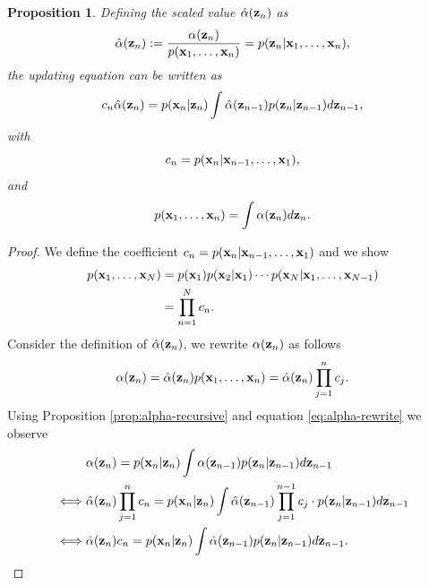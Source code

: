 \documentclass[12pt, oneside]{book}
\numberwithin{equation}{section}
\newcommand{\x}{{\bf x}}
\newcommand{\z}{{\bf z}}
\newtheorem{proposition}{Proposition}[section]
\begin{document}
{%

\begin{proposition} \label{prop:alpha-hat}
	Defining the scaled value $\hat\alpha(\z_n)$ as
	\begin{equation}
		\hat\alpha(\z_n) := \frac{\alpha(\z_n)}{p(\x_1, \ldots, \x_n)} = p(\z_n \vert \x_1, \ldots, \x_n),
	\end{equation}
	the updating equation can be written as
	\begin{equation}
		 c_n \hat\alpha(\z_n) = p(\x_n\vert\z_n)\int \hat\alpha(\z_{n-1})p(\z_n \vert \z_{n-1}) d\z_{n-1},
	\end{equation}
	with
	\begin{equation}
		c_n = p(\x_n \vert \x_{n-1}, \ldots, \x_1),
	\end{equation}
	and
	\begin{equation}
		p(\x_1, \ldots, \x_n) = \int \alpha(\z_n) d\z_n.\\
	\end{equation}
\end{proposition}

\begin{proof}
	We define the coefficient $c_n = p(\x_n \vert \x_{n-1}, \ldots, \x_1)$ and we show
	\begin{align}
		p(\x_1, \ldots, \x_N) &=  p(\x_1) p(\x_2 \vert \x_1) \cdots p(\x_N \vert \x_1, \ldots, \x_{N-1})\\
		&= \prod_{n=1}^N c_n.
	\end{align}
	Consider the definition of $\hat\alpha(\z_n)$, we rewrite $\alpha(\z_n)$ as follows
	\begin{equation} \label{eq:alpha-rewrite}
		\alpha(\z_n) = \hat\alpha(\z_n) p(\x_1, \ldots, \x_n) = \hat\alpha(\z_n) \prod_{j=1}^n c_j.
	\end{equation}
	Using Proposition \ref{prop:alpha-recursive} and equation \eqref{eq:alpha-rewrite} we observe
	\begin{align}
		&\alpha(\z_n) = p(\x_n\vert \z_n) \int  \alpha(\z_{n-1})p(\z_n\vert\z_{n-1}) d\z_{n-1}\\
		\iff & \hat\alpha(\z_n) \prod_{j=1}^{n} c_n = p(\x_n \vert \z_n) \int  \hat\alpha(\z_{n-1}) \prod_{j=1}^{n-1} c_j \cdot  p(\z_n\vert\z_{n-1}) d\z_{n-1}\\
		\iff & \hat\alpha(\z_n) c_n =   p(\x_n \vert \z_n) \int  \hat\alpha(\z_{n-1})   p(\z_n\vert\z_{n-1}) d\z_{n-1}.
	\end{align}
\end{proof}

}
\end{document}
